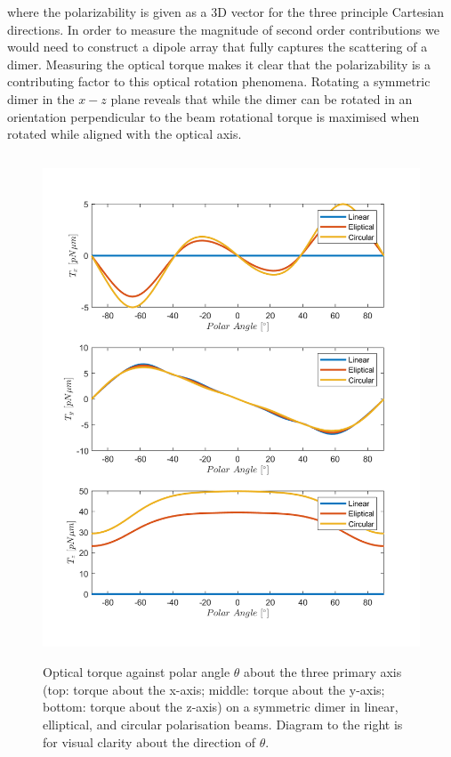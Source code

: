 where the polarizability is given as a 3D vector for the three
principle Cartesian directions. In order to measure the magnitude of
second order contributions we would need to construct a dipole array
that fully captures the scattering of a dimer. Measuring the optical torque 
makes it clear that the polarizability is a contributing factor to this optical 
rotation phenomena. Rotating a symmetric dimer in the $x-z$ plane reveals 
that while the dimer can be rotated in an orientation perpendicular 
to the beam rotational torque is maximised when rotated while aligned with 
the optical axis.
\begin{figure}
	\includegraphics[width=0.65\linewidth,height= 15cm]{torque_different_polarisations.png}
	\caption{Optical torque against polar angle $\theta$ about the three primary axis (top: torque about the x-axis; middle: torque about the y-axis; bottom: torque about the z-axis) on a symmetric dimer in linear, elliptical, and circular polarisation beams. Diagram to the right is for visual clarity about the direction of $\theta$.\vspace{4.5cm}}
\end{figure}
\newpage


